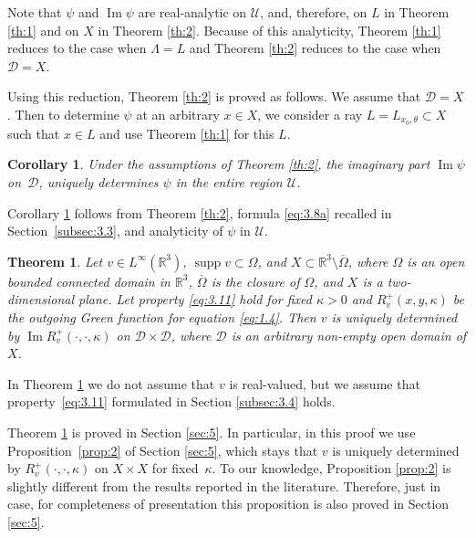 \documentclass[10pt,a4paper]{amsart}
\DeclareMathOperator{\supp}{supp}
\newcommand{\RR}{\mathbb R}
\renewcommand{\Im}{\mathop{\mathrm{Im}}}
\newtheorem{theorem}{Theorem}
\newtheorem{corollary}{Corollary}
\theoremstyle{definition}
\begin{document}
Note that $\psi$ and $\Im\psi$ are real-analytic on $\mathcal{U}$, and, therefore, on $L$ in Theorem \ref{th:1} and on $X$ in Theorem \ref{th:2}.
Because of this analyticity, Theorem \ref{th:1} reduces to the case when $\Lambda=L$ and Theorem \ref{th:2} reduces to the case when $\mathcal{D}=X$.

Using this reduction, Theorem \ref{th:2} is proved as follows.
We assume that $\mathcal{D}=X$.
Then to determine $\psi$ at an arbitrary $x\in X$, we consider a ray $L=L_{x_0, \theta}\subset X$ such that $x\in L$ and use Theorem \ref{th:1} for this $L$.

\begin{corollary}\label{cor:1}
Under the assumptions of Theorem \ref{th:2}, the imaginary part $\Im\psi$ on~$\mathcal{D}$, uniquely determines $\psi$
in the entire region $\mathcal{U}$.
\end{corollary}

Corollary \ref{cor:1} follows from Theorem \ref{th:2}, formula \eqref{eq:3.8a} recalled in Section~\ref{subsec:3.3}, and analyticity of $\psi$ in $\mathcal{U}$.

\begin{theorem}\label{th:3}
Let $v \in L^{\infty}(\RR^3)$, $\supp v \subset \Omega$, and $X \subset \RR^3 \setminus \overline {\Omega}$, where $\Omega$ is an open bounded connected domain in $\RR^3$, $\overline {\Omega}$ is the closure of $\Omega$,
and $X$ is a two-dimensional plane. Let property \eqref{eq:3.11} hold for fixed $\kappa>0$ and $R_v^+(x, y, \kappa)$ be the outgoing Green function for equation \eqref{eq:1.4}.
Then $v$ is uniquely determined by $\Im R_v^+(\cdot, \cdot, \kappa)$ on $\mathcal{D} \times \mathcal{D}$,
where $\mathcal{D}$ is an arbitrary non-empty open domain of $X$.
\end{theorem}

In Theorem \ref{th:3} we do not assume that $v$ is real-valued,
but we assume that property~\eqref{eq:3.11} formulated in Section \ref{subsec:3.4} holds.

Theorem \ref{th:3} is proved in Section \ref{sec:5}.
In particular, in this proof we use Proposition~\ref{prop:2} of Section \ref{sec:5},
which stays that $v$ is uniquely determined by $R_v^+(\cdot, \cdot, \kappa)$ on $X\times X$ for fixed~$\kappa$.
To our knowledge, Proposition \ref{prop:2} is slightly different from the results reported in the literature.
Therefore, just in case, for completeness of presentation this proposition is also proved in Section \ref{sec:5}.

\setcounter{equation}{10}
\end{document}
